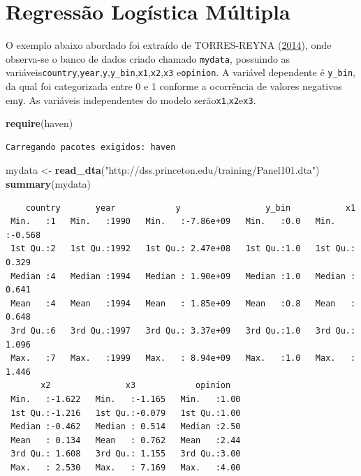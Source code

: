 \documentclass[12pt,brazil,oneside]{book}
\newenvironment{Shaded}{\begin{snugshade}}{\end{snugshade}}
\newcommand{\KeywordTok}[1]{\textcolor[rgb]{0.13,0.29,0.53}{\textbf{#1}}}
\newcommand{\NormalTok}[1]{#1}
\newcommand{\StringTok}[1]{\textcolor[rgb]{0.31,0.60,0.02}{#1}}
\begin{document}
\hypertarget{regressao-logistica-multipla}{%
\section{Regressão Logística Múltipla}\label{regressao-logistica-multipla}}

O exemplo abaixo abordado foi extraído de TORRES-REYNA (\protect\hyperlink{ref-Torres-Reyna2014}{2014}), onde observa-se o banco de dados criado chamado \texttt{mydata}, possuindo as variáveis\texttt{country},\texttt{year},\texttt{y},\texttt{y\_bin},\texttt{x1},\texttt{x2},\texttt{x3} e\texttt{opinion}. A variável dependente é \texttt{y\_bin}, da qual foi categorizada entre 0 e 1 conforme a ocorrência de valores negativos em\texttt{y}. As variáveis independentes do modelo serão\texttt{x1},\texttt{x2}e\texttt{x3}.

\begin{Shaded}
\begin{Highlighting}[]
\KeywordTok{require}\NormalTok{(haven)}
\end{Highlighting}
\end{Shaded}

\begin{verbatim}
Carregando pacotes exigidos: haven
\end{verbatim}

\begin{Shaded}
\begin{Highlighting}[]
\NormalTok{mydata <-}\StringTok{ }\KeywordTok{read_dta}\NormalTok{(}\StringTok{"http://dss.princeton.edu/training/Panel101.dta"}\NormalTok{) }
\KeywordTok{summary}\NormalTok{(mydata)}
\end{Highlighting}
\end{Shaded}

\begin{verbatim}
    country       year            y                 y_bin           x1        
 Min.   :1   Min.   :1990   Min.   :-7.86e+09   Min.   :0.0   Min.   :-0.568  
 1st Qu.:2   1st Qu.:1992   1st Qu.: 2.47e+08   1st Qu.:1.0   1st Qu.: 0.329  
 Median :4   Median :1994   Median : 1.90e+09   Median :1.0   Median : 0.641  
 Mean   :4   Mean   :1994   Mean   : 1.85e+09   Mean   :0.8   Mean   : 0.648  
 3rd Qu.:6   3rd Qu.:1997   3rd Qu.: 3.37e+09   3rd Qu.:1.0   3rd Qu.: 1.096  
 Max.   :7   Max.   :1999   Max.   : 8.94e+09   Max.   :1.0   Max.   : 1.446  
       x2               x3            opinion    
 Min.   :-1.622   Min.   :-1.165   Min.   :1.00  
 1st Qu.:-1.216   1st Qu.:-0.079   1st Qu.:1.00  
 Median :-0.462   Median : 0.514   Median :2.50  
 Mean   : 0.134   Mean   : 0.762   Mean   :2.44  
 3rd Qu.: 1.608   3rd Qu.: 1.155   3rd Qu.:3.00  
 Max.   : 2.530   Max.   : 7.169   Max.   :4.00  
\end{verbatim}
\end{document}
